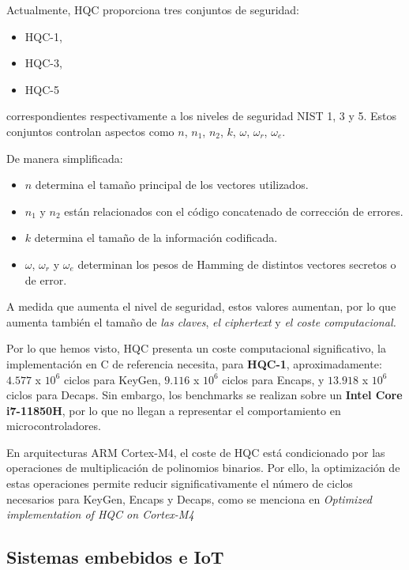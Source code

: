     Actualmente, HQC proporciona tres conjuntos de seguridad:

    \begin{itemize}
        \item HQC-1,
        \item HQC-3,
        \item HQC-5
    \end{itemize}

    correspondientes respectivamente a los niveles de seguridad NIST 1, 3 y 5. Estos conjuntos controlan aspectos como $n$, $n_1$, $n_2$, $k$, $\omega$, 
    $\omega_r$, $\omega_e$.

    De manera simplificada:

    \begin{itemize}
        \item $n$ determina el tamaño principal de los vectores utilizados.
        \item $n_1$ y $n_2$ están relacionados con el código concatenado de corrección de errores.
        \item $k$ determina el tamaño de la información codificada.
        \item $\omega$, $\omega_r$ y $\omega_e$ determinan los pesos de Hamming de distintos vectores secretos o de error.
    \end{itemize}

    A medida que aumenta el nivel de seguridad, estos valores aumentan, por lo que aumenta también el tamaño de \textit{las claves}, \textit{el ciphertext} y \textit{el coste computacional.}

    Por lo que hemos visto, HQC presenta un coste computacional significativo, la implementación en C de referencia necesita, para \textbf{HQC-1}, aproximadamente:
    $4.577$ x $10^6$ ciclos para KeyGen, $9.116$ x $10^6$ ciclos para Encaps, y $13.918$ x $10^6$ ciclos para Decaps. Sin embargo, los benchmarks se realizan sobre un 
    \textbf{Intel Core i7-11850H}, por lo que no llegan a representar el comportamiento en microcontroladores. 

    En arquitecturas ARM Cortex-M4, el coste de HQC está condicionado por las operaciones de multiplicación de polinomios binarios.
    Por ello, la optimización de estas operaciones permite reducir significativamente el número de ciclos necesarios para
    KeyGen, Encaps y Decaps, como se menciona en \textit{Optimized implementation of HQC on Cortex-M4} %

    \subsection{Sistemas embebidos e IoT}

